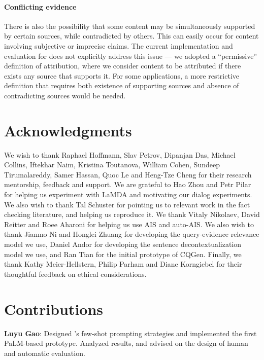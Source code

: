 \documentclass[11pt]{article}
\begin{document}
\paragraph{Conflicting evidence}
There is also the possibility that some content may be simultaneously supported by certain sources, while contradicted by others. This can easily occur for content involving subjective or imprecise claims. The current implementation and evaluation for \approach{} does not explicitly address this issue --- we adopted a ``permissive'' definition of attribution, where we consider content to be attributed if there exists any source that supports it. For some applications, a more restrictive definition that requires both existence of supporting sources and absence of contradicting sources would be needed.




\section*{Acknowledgments}

We wish to thank Raphael Hoffmann, Slav Petrov, Dipanjan Das, Michael Collins, Iftekhar Naim, Kristina Toutanova, William Cohen, Sundeep Tirumalareddy, Samer Hassan, Quoc Le and Heng-Tze Cheng for their research mentorship, feedback and support. We are grateful to Hao Zhou and Petr Pilar for helping us experiment with LaMDA and motivating our dialog experiments. We also wish to thank Tal Schuster for pointing us to relevant work in the fact checking literature, and helping us reproduce it. We thank Vitaly Nikolaev, David Reitter and Roee Aharoni for helping us use AIS and auto-AIS. We also wish to thank Jianmo Ni and Honglei Zhuang for developing the query-evidence relevance model we use, Daniel Andor for developing the sentence decontextualization model we use, and Ran Tian for the initial prototype of CQGen. Finally, we thank Kathy Meier-Hellstern, Philip Parham and Diane Korngiebel for their thoughtful feedback on ethical considerations.

\section*{Contributions}

\textbf{Luyu Gao}: Designed \approach{}'s few-shot prompting strategies and implemented the first PaLM-based prototype. Analyzed results, and advised on the design of human and automatic evaluation.
\end{document}
